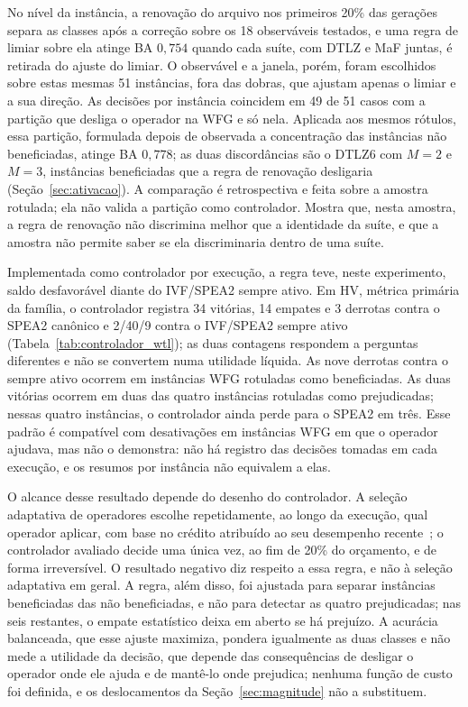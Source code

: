 No nível da instância, a renovação do arquivo nos primeiros 20\% das gerações separa as classes após a correção sobre os 18 observáveis testados, e uma regra de limiar sobre ela atinge BA $0{,}754$ quando cada suíte, com DTLZ e MaF juntas, é retirada do ajuste do limiar. O observável e a janela, porém, foram escolhidos sobre estas mesmas 51 instâncias, fora das dobras, que ajustam apenas o limiar e a sua direção. As decisões por instância coincidem em 49 de 51 casos com a partição que desliga o operador na WFG e só nela. Aplicada aos mesmos rótulos, essa partição, formulada depois de observada a concentração das instâncias não beneficiadas, atinge BA $0{,}778$; as duas discordâncias são o DTLZ6 com $M = 2$ e $M = 3$, instâncias beneficiadas que a regra de renovação desligaria (Seção~\ref{sec:ativacao}). A comparação é retrospectiva e feita sobre a amostra rotulada; ela não valida a partição como controlador. Mostra que, nesta amostra, a regra de renovação não discrimina melhor que a identidade da suíte, e que a amostra não permite saber se ela discriminaria dentro de uma suíte.

Implementada como controlador por execução, a regra teve, neste experimento, saldo desfavorável diante do IVF/SPEA2 sempre ativo. Em HV, métrica primária da família, o controlador registra 34 vitórias, 14 empates e 3 derrotas contra o SPEA2 canônico e 2/40/9 contra o IVF/SPEA2 sempre ativo (Tabela~\ref{tab:controlador_wtl}); as duas contagens respondem a perguntas diferentes e não se convertem numa utilidade líquida. As nove derrotas contra o sempre ativo ocorrem em instâncias WFG rotuladas como beneficiadas. As duas vitórias ocorrem em duas das quatro instâncias rotuladas como prejudicadas; nessas quatro instâncias, o controlador ainda perde para o SPEA2 em três. Esse padrão é compatível com desativações em instâncias WFG em que o operador ajudava, mas não o demonstra: não há registro das decisões tomadas em cada execução, e os resumos por instância não equivalem a elas.

O alcance desse resultado depende do desenho do controlador. A seleção adaptativa de operadores escolhe repetidamente, ao longo da execução, qual operador aplicar, com base no crédito atribuído ao seu desempenho recente~\cite{fialho2008adaptive,maturana2009adaptive}; o controlador avaliado decide uma única vez, ao fim de 20\% do orçamento, e de forma irreversível. O resultado negativo diz respeito a essa regra, e não à seleção adaptativa em geral. A regra, além disso, foi ajustada para separar instâncias beneficiadas das não beneficiadas, e não para detectar as quatro prejudicadas; nas seis restantes, o empate estatístico deixa em aberto se há prejuízo. A acurácia balanceada, que esse ajuste maximiza, pondera igualmente as duas classes e não mede a utilidade da decisão, que depende das consequências de desligar o operador onde ele ajuda e de mantê-lo onde prejudica; nenhuma função de custo foi definida, e os deslocamentos da Seção~\ref{sec:magnitude} não a substituem.

